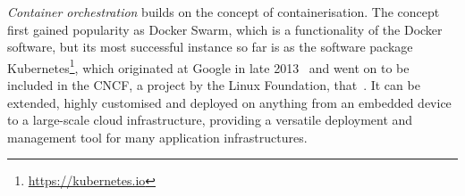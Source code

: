 \emph{Container orchestration} builds on the concept of containerisation.  The concept first gained popularity as Docker Swarm, which is a functionality of the Docker software, but its most successful instance so far is as the software package Kubernetes\footnote{\url{https://kubernetes.io}}, which originated at Google in late 2013~\parencite{kubernetesHistory} and went on to be included in the \ac{CNCF}, a project by the Linux Foundation, that~.
It can be extended, highly customised and deployed on anything from an embedded device to a large-scale cloud infrastructure, providing a versatile deployment and management tool for many application infrastructures.
